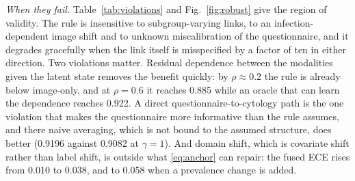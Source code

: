 \documentclass[lettersize,journal]{IEEEtran}
\begin{document}
\emph{When they fail.} Table~\ref{tab:violations} and Fig.~\ref{fig:robust} give the region of validity. The rule is insensitive to subgroup-varying links, to an infection-dependent image shift and to unknown miscalibration of the questionnaire, and it degrades gracefully when the link itself is misspecified by a factor of ten in either direction. Two violations matter. Residual dependence between the modalities given the latent state removes the benefit quickly: by $\rho\approx0.2$ the rule is already below image-only, and at $\rho=0.6$ it reaches 0.885 while an oracle that can learn the dependence reaches 0.922. A direct questionnaire-to-cytology path is the one violation that makes the questionnaire more informative than the rule assumes, and there naive averaging, which is not bound to the assumed structure, does better (0.9196 against 0.9082 at $\gamma=1$). And domain shift, which is covariate shift rather than label shift, is outside what \eqref{eq:anchor} can repair: the fused ECE rises from 0.010 to 0.038, and to 0.058 when a prevalence change is added.

\begin{table}[t]
\caption{Region of Validity: AUROC When Each Assumption Is Violated}
\label{tab:violations}
\centering\footnotesize
\setlength{\tabcolsep}{2.5pt}
\end{table}
\end{document}
